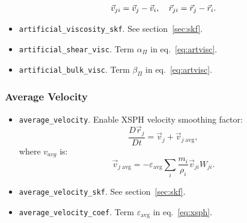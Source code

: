 \begin{itemize}
    \begin{equation}
        \begin{tabular}{l l}
              $\displaystyle{
              \vec{v}_{ji} = \vec{v}_{j} - \vec{v}_{i}
              }$,
              &
              $\displaystyle{
              \vec{r}_{ji} = \vec{r}_{j} - \vec{r}_{i}
              }$.
          \end{tabular}  
    \end{equation}

    \item \verb|artificial_viscosity_skf|. See section~\ref{sec:skf}.
    \item \verb|artificial_shear_visc|. Term $\alpha_{\Pi}$ in eq.~\ref{eq:artvisc}.
    \item \verb|artificial_bulk_visc|. Term $\beta_{\Pi}$ in eq.~\ref{eq:artvisc}.
\end{itemize}

\subsubsection{Average Velocity}
\begin{itemize}
    \item \verb|average_velocity|. Enable XSPH velocity smoothing factor:
    \begin{equation}
        \frac{D\vec{r}_j}{Dt} = \vec{v}_{j} + \vec{v}_{j\;\text{avg}},
    \end{equation}
    where $v_{avg}$ is:
    \begin{equation}\label{eq:xsph}
        \vec{v}_{j\;\text{avg}} = -\varepsilon_{\text{avg}}
        \sum\limits_{i}\frac{m_{i}}{\rho_{i}}\vec{v}_{ji}W_{ji}.
    \end{equation}

    \item \verb|average_velocity_skf|. See section~\ref{sec:skf}.
    \item \verb|average_velocity_coef|. Term $\varepsilon_{\text{avg}}$ in eq.~\ref{eq:xsph}.
\end{itemize}

